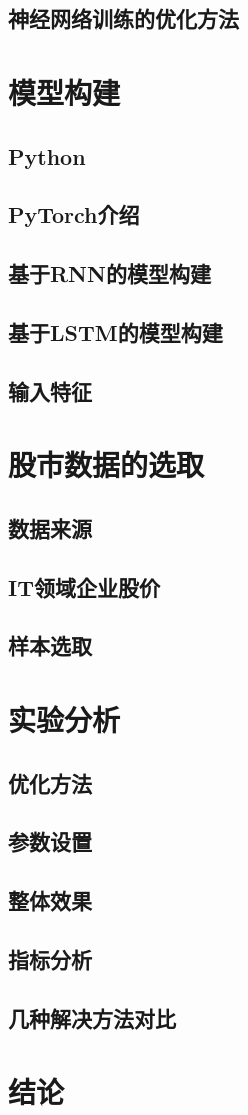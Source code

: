 \documentclass[UTF8]{ctexart}
\begin{document}
\subsection{神经网络训练的优化方法}
\section{模型构建}
\subsection{Python}
\subsection{PyTorch介绍}
\subsection{基于RNN的模型构建}
\subsection{基于LSTM的模型构建}
\subsection{输入特征}
\section{股市数据的选取}
\subsection{数据来源}
\subsection{IT领域企业股价}
\subsection{样本选取}
\section{实验分析}
\subsection{优化方法}
\subsection{参数设置}
\subsection{整体效果}
\subsection{指标分析}
\subsection{几种解决方法对比}
\section{结论}


\end{document}
